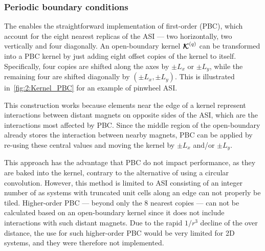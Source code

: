 \subsubsection{Periodic boundary conditions}\label{sec:2:Kernels:PBC}
The  enables the straightforward implementation of first-order  (PBC), which account for the eight nearest replicas of the ASI --- two horizontally, two vertically and four diagonally.
An open-boundary kernel $\boldsymbol{\mathbf{\mathcal{K}}}^{(q)}$ can be transformed into a PBC kernel by just adding eight offset copies of the kernel to itself.
Specifically, four copies are shifted along the axes by $\pm L_x$ or $\pm L_y$, while the remaining four are shifted diagonally by $(\pm L_x, \pm L_y)$.
This is illustrated in~\cref{fig:2:Kernel_PBC} for an example of pinwheel ASI. \par
This construction works because elements near the edge of a kernel represent interactions between distant magnets on opposite sides of the ASI, which are the interactions most affected by PBC.
Since the middle region of the open-boundary  already stores the interaction between nearby magnets, PBC can be applied by re-using these central values and moving the kernel by $\pm L_x$ and/or $\pm L_y$. \\\par

This approach has the advantage that PBC do not impact performance, as they are baked into the kernel, contrary to the alternative of using a circular convolution.
However, this method is limited to ASI consisting of an integer number of  as systems with truncated unit cells along an edge can not properly be tiled.
Higher-order PBC --- beyond only the 8 nearest copies --- can not be calculated based on an open-boundary kernel since it does not include interactions with such distant magnets.
Due to the rapid $1/r^3$ decline of the  over distance, the use for such higher-order PBC would be very limited for 2D systems, and they were therefore not implemented.

